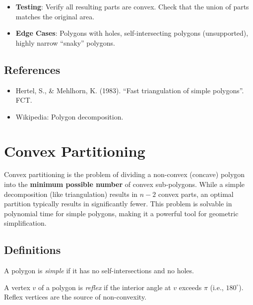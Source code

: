 \begin{itemize}
\item \textbf{Testing}: Verify all resulting parts are convex. Check that the union of parts matches the original area.
\item \textbf{Edge Cases}: Polygons with holes, self-intersecting polygons (unsupported), highly narrow ``snaky'' polygons.
\end{itemize}

\subsection{References}

\begin{itemize}
\item Hertel, S., \& Mehlhorn, K. (1983). ``Fast triangulation of simple polygons''. FCT.
\item Wikipedia: Polygon decomposition.
\end{itemize}


\section{Convex Partitioning}
\label{sec:convex_partitioning}

Convex partitioning is the problem of dividing a non-convex (concave) polygon into the \textbf{minimum possible number} of convex sub-polygons. While a simple decomposition (like triangulation) results in $n-2$ convex parts, an optimal partition typically results in significantly fewer. This problem is solvable in polynomial time for simple polygons, making it a powerful tool for geometric simplification.

\subsection{Definitions}

\begin{definition}\label{def:simple_polygon}
A polygon is \emph{simple} if it has no self-intersections and no holes.
\end{definition}

\begin{definition}\label{def:reflex_vertex}
A vertex $v$ of a polygon is \emph{reflex} if the interior angle at $v$ exceeds $\pi$ (i.e., $180^\circ$). Reflex vertices are the source of non-convexity.
\end{definition}

